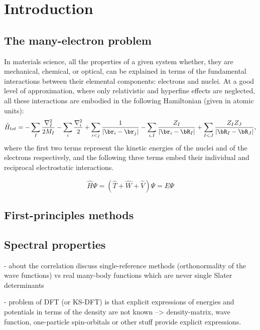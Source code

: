 \cleardoublepage
\chapter{Introduction\label{ch:introduction}}

\section{The many-electron problem}
In materials science, all the properties of a given system whether, they are mechanical, chemical, or optical, can be explained in terms of the fundamental interactions between their elemental components: electrons and nuclei. At a good level of approximation, where only relativistic and hyperfine effects are neglected, all these interactions are embodied in the following Hamiltonian (given in atomic units):
%
\begin{equation}
    \hat{H}_{tot} = - \sum_I \frac{\nabla_I^2}{2M_I} - \sum_i \frac{\nabla_i^2}{2} + \sum_{i < j} \frac{1}{|\br_i - \br_j|} - \sum_{i,I} \frac{Z_I}{|\br_i - \bR_I|} + \sum_{I < J} \frac{Z_I Z_J}{|\bR_I - \bR_J|} ,
    \label{eq:many-body}
\end{equation}
%
where the first two terms represent the kinetic energies of the nuclei and of the electrons respectively, and the following three terms embed their individual and reciprocal electrostatic interactions.

\begin{equation}
    \hat{H} \Psi = \left(\hat{T} + \hat{W} + \hat{V} \right) \Psi = E \Psi
    \label{eq:many-electron-problem}
\end{equation}

\section{First-principles methods}

\section{Spectral properties}
- about the correlation discuss single-reference methods (orthonormality of the wave functions) vs real many-body functions which are never single Slater determinants

- problem of DFT (or KS-DFT) is that explicit expressions of energies and potentials in terms of the density are not known --> density-matrix, wave function, one-particle spin-orbitals or other stuff provide explicit expressions.

